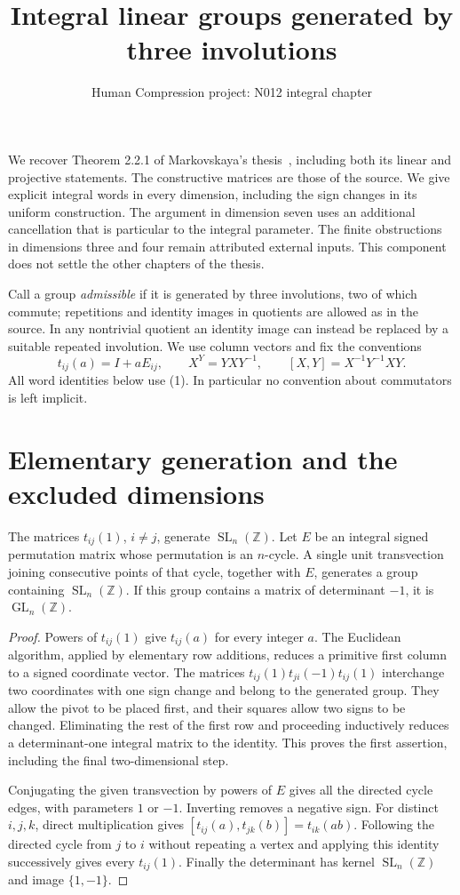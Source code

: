 \documentclass[11pt,a4paper]{article}
\title{Integral linear groups generated by three involutions}
\author{Human Compression project: N012 integral chapter}
\date{}
\newcommand{\GL}{\operatorname{GL}}\newcommand{\SL}{\operatorname{SL}}
\begin{document}
\maketitle
We recover Theorem 2.2.1 of Markovskaya's thesis~\cite{M}, including
both its linear and projective statements. The constructive matrices
are those of the source. We give explicit integral words in every
dimension, including the sign changes in its uniform construction.
The argument in dimension seven uses an additional cancellation that
is particular to the integral parameter. The finite obstructions in
dimensions three and four remain attributed external inputs.
This component does not settle the other chapters of the thesis.

Call a group \emph{admissible} if it is generated by three involutions,
two of which commute; repetitions and identity images in quotients are
allowed as in the source. In any nontrivial quotient an identity image
can instead be replaced by a suitable repeated involution. We use
column vectors and fix the conventions
\[
 t_{ij}(a)=I+aE_{ij},\qquad X^Y=YXY^{-1},\qquad
 [X,Y]=X^{-1}Y^{-1}XY.                                      \tag{1}
\]
All word identities below use (1). In particular no convention about
commutators is left implicit.

\section{Elementary generation and the excluded dimensions}
\begin{lemma}\label{roots}
The matrices $t_{ij}(1)$, $i\ne j$, generate $\SL_n(\mathbb Z)$.
Let $E$ be an integral signed permutation matrix whose permutation is
an $n$-cycle. A single unit transvection joining consecutive points
of that cycle, together with $E$, generates a group containing
$\SL_n(\mathbb Z)$. If this group contains a matrix of determinant
$-1$, it is $\GL_n(\mathbb Z)$.
\end{lemma}
\begin{proof}
Powers of $t_{ij}(1)$ give $t_{ij}(a)$ for every integer $a$.
The Euclidean algorithm, applied by elementary row additions, reduces
a primitive first column to a signed coordinate vector. The matrices
$t_{ij}(1)t_{ji}(-1)t_{ij}(1)$ interchange two coordinates with one
sign change and belong to the generated group. They allow the pivot
to be placed first, and their squares allow two signs to be changed.
Eliminating the rest of the first row and proceeding inductively
reduces a determinant-one integral matrix to the identity. This proves
the first assertion, including the final two-dimensional step.

Conjugating the given transvection by powers of $E$ gives all the
directed cycle edges, with parameters $1$ or $-1$. Inverting removes
a negative sign. For distinct $i,j,k$, direct multiplication gives
$[t_{ij}(a),t_{jk}(b)]=t_{ik}(ab)$. Following the directed cycle from
$j$ to $i$ without repeating a vertex and applying this identity
successively gives every $t_{ij}(1)$. Finally the determinant has
kernel $\SL_n(\mathbb Z)$ and image $\{1,-1\}$.
\end{proof}
\end{document}
